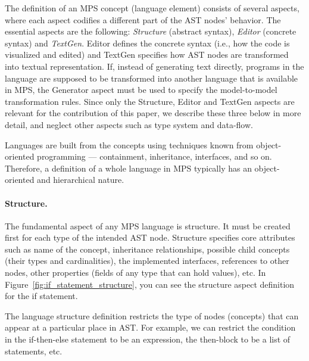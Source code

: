 The definition of an MPS concept (language element) consists of several aspects, where each aspect codifies a different part of the AST nodes' behavior.
The essential aspects are the following: \emph{Structure} (abstract syntax), \emph{Editor} (concrete syntax) and \emph{TextGen}.
Editor defines the concrete syntax (i.e., how the code is visualized and edited) and TextGen specifies how AST nodes are transformed into textual representation.
If, instead of generating text directly, programs in the language are supposed to be transformed into another language that is available in MPS, the Generator aspect must be used to specify the model-to-model transformation rules.
Since only the Structure, Editor and TextGen aspects are relevant for the contribution of this paper, we describe these three below in more detail, and neglect other aspects such as type system and data-flow.

Languages are built from the concepts using techniques known from object-oriented programming --- containment, inheritance, interfaces, and so on.
Therefore, a definition of a whole language in MPS typically has an object-oriented and hierarchical nature.








\paragraph{Structure.}
 The fundamental aspect of any MPS language is structure. It must be created first for each type of the intended AST node. Structure specifies core attributes such as name of the concept, inheritance relationships, possible child concepts (their types and cardinalities), the implemented interfaces, references to other nodes, other properties (fields of any type that can hold values), etc.
In Figure~\ref{fig:if_statement_structure}, you can see the structure aspect definition for the if statement.

The language structure definition restricts the type of nodes (concepts) that can appear at a particular place in AST.
For example, we can restrict the condition in the if-then-else statement to be an expression, the then-block to be a list of statements, etc.

